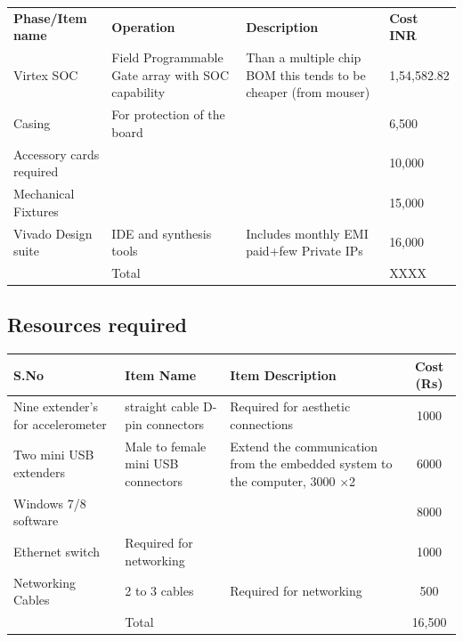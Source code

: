 \documentclass{FR16}
\begin{document}
\begin{table}[ht]
\setlength{\extrarowheight}{15pt}
\begin{tabular}{||p{3 cm} ||p{4 cm}|| p{5 cm}|| p{2 cm}|| }
\hline
\hline
\rowcolor{orange}
\hline
\hline


{\bfseries Phase/Item name } & {\bfseries Operation}& {\bfseries Description} & {\bfseries Cost INR} \\

\arrayrulecolor{white}

\rowcolor{Gray}
\hline
\hline
Virtex SOC &Field Programmable Gate array with SOC capability&Than a multiple chip BOM this tends to be cheaper (from mouser) &1,54,582.82\\
\rowcolor{Gray}
\hline
\hline
Casing& For protection of the board& &6,500 \\
\rowcolor{Gray}
\hline
\hline
Accessory cards required &&  & 10,000  \\
\hline
\hline

\rowcolor{Gray}

Mechanical Fixtures& & & 15,000\\

\rowcolor{Gray}
\hline
\hline
Vivado Design suite&IDE and synthesis tools&Includes monthly EMI paid+few Private IPs&16,000 \\

\hline
\hline


& Total & & XXXX
\end{tabular}
\end{table}



\newpage
\subsection{Resources required}
\begin{center}
\begin{tabular}{||p{3 cm} ||p{4 cm}|| p{6 cm}|| c|| }
\arrayrulecolor{Azzurro}
\hline
\hline
{\bfseries S.No} & {\bfseries Item Name}& {\bfseries Item Description} & {\bfseries Cost (Rs)} \\
\hline
\hline
Nine extender's for accelerometer &straight cable D-pin connectors & Required for aesthetic connections & 1000\\
\hline
\hline
Two mini USB extenders & Male to female mini USB connectors& Extend the communication from the embedded system to the computer, 3000 $\times$2 & 6000\\
\hline
\hline
Windows 7/8 software & &   & 8000\\
\hline
\hline
Ethernet switch & Required for networking & &1000\\
\hline
\hline
Networking Cables & 2 to 3 cables & Required for networking &500\\
\hline
\hline
& Total & & 16,500
 
 \end{tabular}
\end{center}
\end{document}
